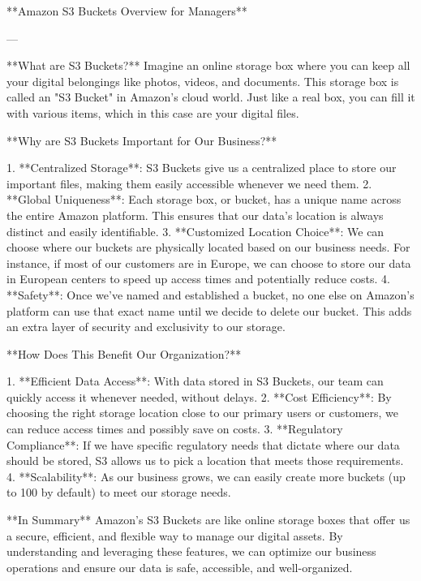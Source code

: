 **Amazon S3 Buckets Overview for Managers**

---

**What are S3 Buckets?**
Imagine an online storage box where you can keep all your digital belongings like photos, videos, and documents. This storage box is called an "S3 Bucket" in Amazon's cloud world. Just like a real box, you can fill it with various items, which in this case are your digital files.

**Why are S3 Buckets Important for Our Business?**

1. **Centralized Storage**: S3 Buckets give us a centralized place to store our important files, making them easily accessible whenever we need them.
2. **Global Uniqueness**: Each storage box, or bucket, has a unique name across the entire Amazon platform. This ensures that our data's location is always distinct and easily identifiable.
3. **Customized Location Choice**: We can choose where our buckets are physically located based on our business needs. For instance, if most of our customers are in Europe, we can choose to store our data in European centers to speed up access times and potentially reduce costs.
4. **Safety**: Once we've named and established a bucket, no one else on Amazon's platform can use that exact name until we decide to delete our bucket. This adds an extra layer of security and exclusivity to our storage.

**How Does This Benefit Our Organization?**

1. **Efficient Data Access**: With data stored in S3 Buckets, our team can quickly access it whenever needed, without delays.
2. **Cost Efficiency**: By choosing the right storage location close to our primary users or customers, we can reduce access times and possibly save on costs.
3. **Regulatory Compliance**: If we have specific regulatory needs that dictate where our data should be stored, S3 allows us to pick a location that meets those requirements.
4. **Scalability**: As our business grows, we can easily create more buckets (up to 100 by default) to meet our storage needs.

**In Summary**
Amazon's S3 Buckets are like online storage boxes that offer us a secure, efficient, and flexible way to manage our digital assets. By understanding and leveraging these features, we can optimize our business operations and ensure our data is safe, accessible, and well-organized.